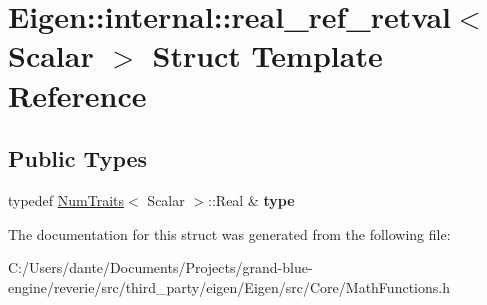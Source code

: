 \hypertarget{struct_eigen_1_1internal_1_1real__ref__retval}{}\section{Eigen\+::internal\+::real\+\_\+ref\+\_\+retval$<$ Scalar $>$ Struct Template Reference}
\label{struct_eigen_1_1internal_1_1real__ref__retval}
\subsection*{Public Types}
\begin{DoxyCompactItemize}
\item 
\mbox{\label{struct_eigen_1_1internal_1_1real__ref__retval_af0d72abf73afb308f14f0ff7751ab493}} 
typedef \mbox{\hyperlink{struct_eigen_1_1_num_traits}{Num\+Traits}}$<$ Scalar $>$\+::Real \& {\bfseries type}
\end{DoxyCompactItemize}


The documentation for this struct was generated from the following file\+:\begin{DoxyCompactItemize}
\item 
C\+:/\+Users/dante/\+Documents/\+Projects/grand-\/blue-\/engine/reverie/src/third\+\_\+party/eigen/\+Eigen/src/\+Core/Math\+Functions.\+h\end{DoxyCompactItemize}

